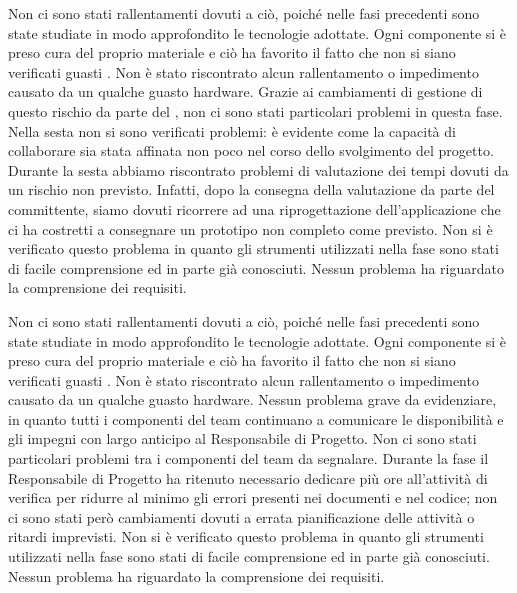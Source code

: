 		Non ci sono stati rallentamenti dovuti a ciò, poiché nelle fasi precedenti sono state studiate in modo approfondito le tecnologie adottate.
		Ogni componente si è preso cura del proprio materiale e ciò ha favorito il fatto che non si siano verificati guasti . Non è stato riscontrato alcun rallentamento o impedimento causato da un qualche guasto hardware.
		Grazie ai cambiamenti di gestione di questo rischio da parte del , non ci sono stati particolari problemi in questa fase.
		Nella sesta  non si sono verificati problemi: è evidente come la capacità di collaborare sia stata affinata non poco nel corso dello svolgimento del progetto.
		Durante la sesta  abbiamo riscontrato problemi di valutazione dei tempi dovuti da un rischio non previsto. Infatti, dopo la consegna della valutazione da parte del committente, siamo dovuti ricorrere ad una riprogettazione dell'applicazione  che ci ha costretti a consegnare un prototipo non completo come previsto.
		Non si è verificato questo problema in quanto gli strumenti utilizzati nella fase sono stati di facile comprensione ed in parte già conosciuti.
		Nessun problema ha riguardato la comprensione dei requisiti.

		Non ci sono stati rallentamenti dovuti a ciò, poiché nelle fasi precedenti sono state studiate in modo approfondito le tecnologie adottate.
		Ogni componente si è preso cura del proprio materiale e ciò ha favorito il fatto che non si siano verificati guasti . Non è stato riscontrato alcun rallentamento o impedimento causato da un qualche guasto hardware.
		Nessun problema grave da evidenziare, in quanto tutti i componenti del team continuano a comunicare le disponibilità e gli impegni con largo anticipo al Responsabile di Progetto.
		Non ci sono stati particolari problemi tra i componenti del team da segnalare.
		Durante la fase il Responsabile di Progetto ha ritenuto necessario dedicare più ore all'attività di verifica per ridurre al minimo gli errori presenti nei documenti e nel codice; non ci sono stati però cambiamenti dovuti a errata pianificazione delle attività o ritardi imprevisti.
		Non si è verificato questo problema in quanto gli strumenti utilizzati nella fase sono stati di facile comprensione ed in parte già conosciuti.
		Nessun problema ha riguardato la comprensione dei requisiti.
